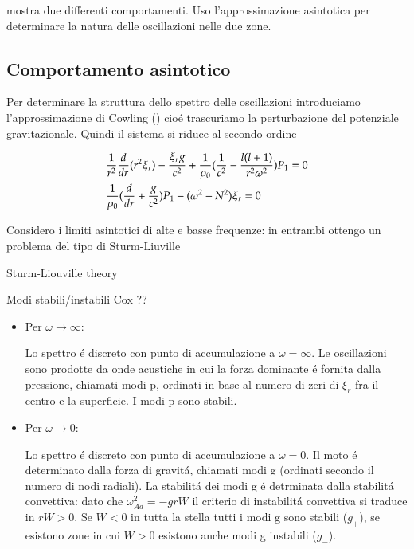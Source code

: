 \documentclass[../main.tex]{subfiles}
\begin{document}
mostra due differenti comportamenti. Uso l'approssimazione asintotica per determinare la natura delle oscillazioni nelle due zone.

\clearpage

\subsection{Comportamento asintotico}


Per determinare la struttura dello spettro delle oscillazioni introduciamo l'approssimazione di Cowling (\cite{cow41oscillations}) cio\'e trascuriamo la perturbazione del potenziale gravitazionale. Quindi il sistema si riduce al secondo ordine

\begin{align}
&\frac{1}{r^2}\frac{d}{d r}(r^2\xi_r)-\frac{\xi_rg}{c^2}+\frac{1}{\rho_0}(\frac{1}{c^2}-\frac{l(l+1)}{r^2\omega^2})P_1=0\label{eq:cowosc}\\
&\frac{1}{\rho_0}(\frac{d}{d r}+\frac{g}{c^2})P_1-(\omega^2-N^2)\xi_r=0\nonumber
\end{align}

Considero i limiti asintotici di alte e basse frequenze: in entrambi ottengo un problema del tipo di Sturm-Liuville

\begin{todo}{Sturm-Liouville theory}
\end{todo}

\begin{todo}{Modi stabili/instabili}
Cox ??
\end{todo}

\begin{itemize}
\item Per $\omega\to\infty$:

Lo spettro \'e discreto con punto di accumulazione a $\omega=\infty$.
Le oscillazioni sono prodotte da onde acustiche in cui la forza dominante \'e fornita dalla pressione, chiamati modi p, ordinati in base al numero di zeri di $\xi_r$ fra il centro e la superficie. I modi p sono stabili.

\item Per $\omega\to0$:

Lo spettro \'e discreto con punto di accumulazione a $\omega=0$.
Il moto \'e determinato dalla forza di gravit\'a, chiamati modi g (ordinati secondo il numero di nodi radiali). La stabilit\'a dei modi g \'e detrminata dalla stabilit\'a convettiva: dato che $\omega^2_{Ad}=-grW$ il criterio di instabilit\'a convettiva si traduce in $rW>0$. Se $W<0$ in tutta la stella tutti i modi g sono stabili ($g_+$), se esistono zone in cui $W>0$ esistono anche modi g instabili ($g_-$).
\end{itemize}
\end{document}
